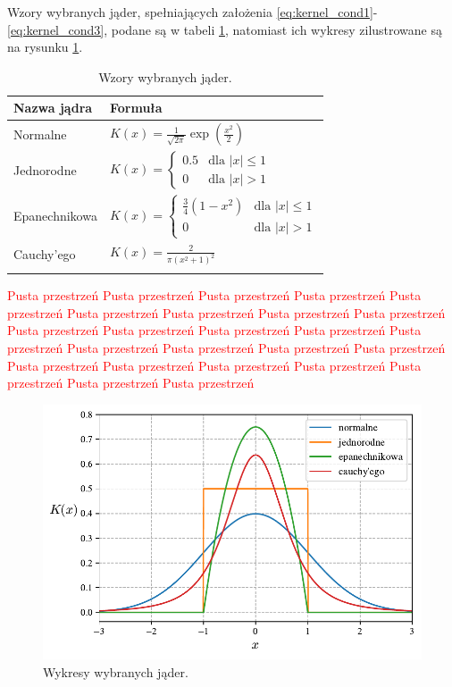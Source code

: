 \documentclass[12pt,a4paper,oneside]{book}
\theoremstyle{definition}
\begin{document}
Wzory wybranych jąder, spełniających założenia \eqref{eq:kernel_cond1}-\eqref{eq:kernel_cond3}, podane są w tabeli \ref{table:kernels}, natomiast ich wykresy zilustrowane są na rysunku \ref{fig:kernels}.
\begin{table}[H]
\caption{Wzory wybranych jąder.}
\centering
\begin{tabular}{ ll }
\toprule
\textbf{Nazwa jądra} & \textbf{Formuła} \\ 
\toprule
\addlinespace[0.2cm]
Normalne & $K(x) = \frac{1}{\sqrt{2 \pi}} \exp \left( \frac{x^2}{2} \right)$ \\
\addlinespace[0.2cm]
Jednorodne & $K(x) = \begin{cases} 0.5 & \text{dla } |x| \leq 1 \\ 0 & \text{dla } |x| > 1  \end{cases}$ \\ 
\addlinespace[0.2cm]
Epanechnikowa & $K(x) = \begin{cases} \frac{3}{4} (1 - x^2) & \text{dla } |x| \leq 1 \\ 0 & \text{dla } |x| > 1  \end{cases}$ \\ 
\addlinespace[0.2cm]
Cauchy'ego & $K(x) = \frac{2}{\pi (x^2 + 1)^2}$ \\
\addlinespace[0.1cm]
\bottomrule
\end{tabular}
\label{table:kernels}
\end{table}
\textcolor{red}{Pusta przestrzeń Pusta przestrzeń Pusta przestrzeń Pusta przestrzeń Pusta przestrzeń Pusta przestrzeń Pusta przestrzeń Pusta przestrzeń Pusta przestrzeń Pusta przestrzeń Pusta przestrzeń Pusta przestrzeń Pusta przestrzeń Pusta przestrzeń Pusta przestrzeń Pusta przestrzeń Pusta przestrzeń Pusta przestrzeń Pusta przestrzeń Pusta przestrzeń Pusta przestrzeń Pusta przestrzeń Pusta przestrzeń Pusta przestrzeń Pusta przestrzeń}

\begin{figure}[H]
    \centering
    \includegraphics[scale=0.65]{kernels}
    \vspace{-0.5cm} 
    \caption{Wykresy wybranych jąder.}
    \label{fig:kernels}
\end{figure}
\end{document}

